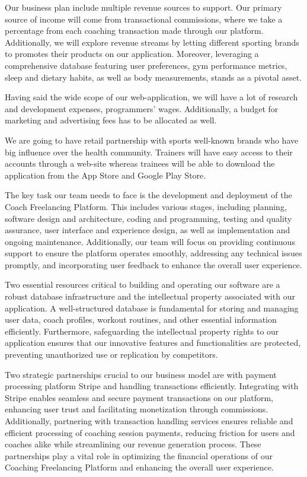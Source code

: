 \documentclass[12pt]{report}
\begin{document}
Our business plan include multiple revenue sources to support. Our primary source of income will come from transactional commissions, where we take a percentage from each coaching transaction made through our platform. Additionally, we will explore revenue streams by letting different sporting brands to promotes their products on our application. Moreover, leveraging a comprehensive database featuring user preferences, gym performance metrics, sleep and dietary habits, as well as body measurements, stands as a pivotal asset.

Having said the wide scope of our web-application, we will have a lot of research and development expenses, programmers’ wages. Additionally, a budget for marketing and advertising fees has to be allocated as well. 

We are going to have retail partnership with sports well-known brands who have big influence over the health community. Trainers will have easy access to their accounts through a web-site whereas trainees will be able to download the application from the App Store and Google Play Store. 

The key task our team needs to face is the development and deployment of the Coach Freelancing Platform. This includes various stages, including planning, software design and architecture, coding and programming, testing and quality assurance, user interface and experience design, as well as implementation and ongoing maintenance. Additionally, our team will focus on providing continuous support to ensure the platform operates smoothly, addressing any technical issues promptly, and incorporating user feedback to enhance the overall user experience.

Two essential resources critical to building and operating our software are a robust database infrastructure and the intellectual property associated with our application. A well-structured database is fundamental for storing and managing user data, coach profiles, workout routines, and other essential information efficiently. Furthermore, safeguarding the intellectual property rights to our application ensures that our innovative features and functionalities are protected, preventing unauthorized use or replication by competitors.

Two strategic partnerships crucial to our business model are with payment processing platform Stripe and handling transactions efficiently. Integrating with Stripe enables seamless and secure payment transactions on our platform, enhancing user trust and facilitating monetization through commissions. Additionally, partnering with transaction handling services ensures reliable and efficient processing of coaching session payments, reducing friction for users and coaches alike while streamlining our revenue generation process. These partnerships play a vital role in optimizing the financial operations of our Coaching Freelancing Platform and enhancing the overall user experience.
\end{document}

